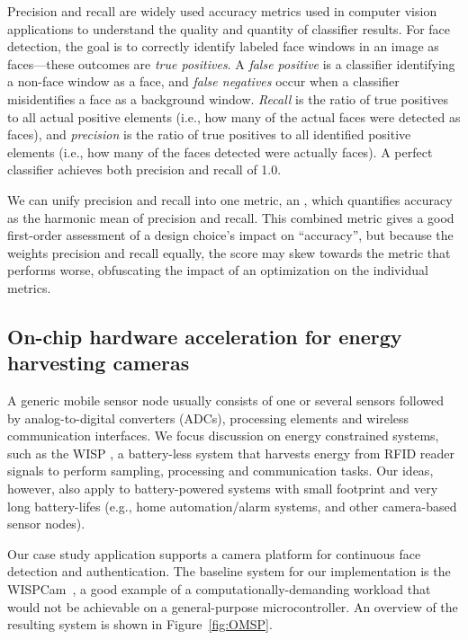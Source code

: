 Precision and recall are widely used accuracy metrics used in computer vision applications to understand the quality and quantity of classifier results. For face detection, the goal is to correctly identify labeled face windows in an image as faces---these outcomes are \textit{true positives}. A \textit{false positive} is a classifier identifying a non-face window as a face, and \textit{false negatives} occur when a classifier misidentifies a face as a background window. \emph{Recall} is the ratio of true positives to all actual positive elements (i.e., how many of the actual faces were detected as faces), and \emph{precision} is the ratio of true positives to all identified positive elements (i.e., how many of the faces detected were actually faces). A perfect classifier achieves both precision and recall of 1.0.

We can unify precision and recall into one metric, an \textit{\fscore}, which quantifies accuracy as the harmonic mean of precision and recall.
This combined metric
gives a good first-order assessment of a design choice's impact on ``accuracy'', but because the \fscore  weights precision and recall equally, the score may skew towards the metric that performs worse, obfuscating the impact of an optimization on the individual metrics.

\subsection{On-chip hardware acceleration for energy harvesting cameras}

A generic mobile sensor node usually consists of one or several sensors followed by analog-to-digital converters (ADCs), processing elements and wireless communication interfaces. We focus discussion on energy constrained systems, such as the WISP \cite{wisp}, a battery-less system that  harvests energy from RFID reader signals to perform sampling, processing and communication tasks. Our ideas, however, also apply to battery-powered systems with small footprint and very long battery-lifes (e.g., home automation/alarm systems, and other camera-based sensor nodes).

Our case study application supports a camera platform for continuous face detection and authentication. The baseline system for our implementation is the WISPCam~\cite{wispcam}, a good example of a computationally-demanding workload that would not be achievable on a general-purpose microcontroller.
An overview of the resulting system is shown in Figure~\ref{fig:OMSP}.

